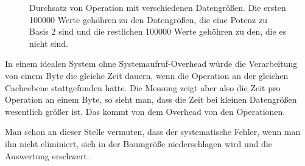 \begin{figure}[ht]
	\hfill
	\hfill
	\hfill
	\caption{Durchsatz von Operation mit verschiedenen Datengrößen. Die ersten 100000 Werte gehöhren zu den Datengrößen, die eine Potenz zu Basis 2 sind und die restlichen 100000 Werte gehöhren zu den, die es nicht sind.}
	\label{fig:eva:origperf}
\end{figure}

In einem idealen System ohne Systemaufruf-Overhead würde die Verarbeitung von einem Byte die gleiche Zeit dauern, wenn die Operation an der gleichen Cacheebene stattgefunden hätte.
Die Messung zeigt aber  also die Zeit pro Operation an einem Byte, so sieht man, dass die Zeit bei kleinen Datengrößen wesentlich größer ist.
Das kommt von dem Overhead von den Operationen.

Man schon an dieser Stelle vermuten, dass der systematische Fehler, wenn man ihn nicht eliminiert, sich in der Baumgröße niederschlagen wird und die Auswertung erschwert.

